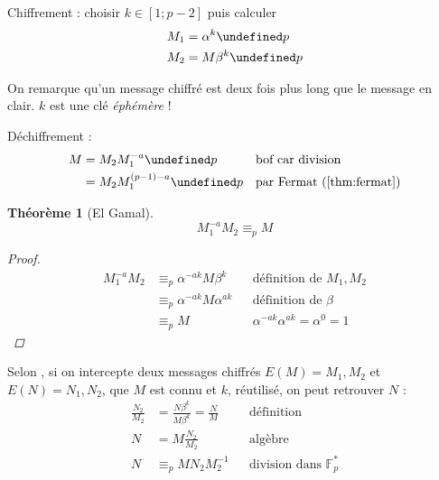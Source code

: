 \documentclass[11pt,twocolumn]{article}
\let\mod\undefined
\DeclareMathOperator{\mod}{mod}
\theoremstyle{plain}
\newtheorem{thm}{Théorème}
\newcommand{\esF}{\mathbb{F}} %
\begin{document}
Chiffrement : choisir $k \in [1;p-2]$ puis calculer
\begin{align*}
	M_1 &= \alpha^k \mod p \\
	M_2 &= M\beta^k \mod p
\end{align*}

On remarque qu'un message chiffré est deux fois plus long
que le message en clair. $k$ est une clé \emph{éphémère} !

Déchiffrement :
\begin{align*}
	M &= M_2 M_1^{-a} \mod p && \text{bof car division} \\
	&= M_2 M_1^{(p-1)-a} \mod p && \text{par Fermat (\ref{thm:fermat})}
\end{align*}

\begin{thm}[El Gamal]
	\[
		M_1^{-a}M_2 \equiv_p M
	\]
	\begin{proof}
		\begin{align*}
			M_1^{-a}M_2
			&\equiv_p \alpha^{-ak}M\beta^k && \text{définition de } M_1, M_2 \\
			&\equiv_p \alpha^{-ak}M\alpha^{ak} && \text{définition de } \beta \\
			&\equiv_p M && \alpha^{-ak}\alpha^{ak}=\alpha^0=1
		\end{align*}
	\end{proof}
\end{thm}

Selon \cite[p. 296]{hac}, si on intercepte deux messages chiffrés
$E(M)=M_1,M_2$ et $E(N)=N_1,N_2$, que $M$ est connu et $k$, réutilisé,
on peut retrouver $N$ :
\begin{align*}
	\frac{N_2}{M_2} &= \frac{N\beta^k}{M\beta^k} = \frac NM
		&& \text{définition} \\
	N &= M\frac{N_2}{M_2}
		&& \text{algèbre} \\
	N &\equiv_p MN_2M_2^{-1}
		&& \text{division dans }\esF_p^*
\end{align*}


\newpage


\end{document}
